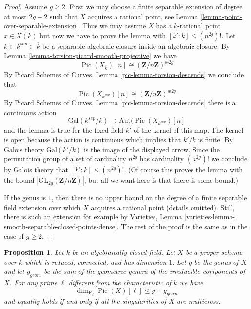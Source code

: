 \documentclass{stacks-project}
\theoremstyle{plain}
\newtheorem{proposition}[subsection]{Proposition}
\theoremstyle{definition}
\theoremstyle{remark}
\numberwithin{equation}{subsection}
\def\Pic{\mathop{\mathrm{Pic}}\nolimits}
\begin{document}
\begin{proof}
Assume $g \geq 2$. First we may choose a finite separable extension
of degree at most $2g - 2$ such that $X$ acquires a rational point, see
Lemma \ref{lemma-point-over-separable-extension}.
Thus we may assume $X$ has a $k$-rational point $x \in X(k)$
but now we have to prove the lemma with
$[k' : k] \leq (n^{2g})!$.
Let $k \subset k^{sep} \subset \overline{k}$ be a separable algebraic
closure inside an algebraic closure.
By Lemma \ref{lemma-torsion-picard-smooth-projective} we have
$$
\Pic(X_{\overline{k}})[n] \cong (\mathbf{Z}/n\mathbf{Z})^{\oplus 2g}
$$
By Picard Schemes of Curves, Lemma \ref{pic-lemma-torsion-descends}
we conclude that
$$
\Pic(X_{k^{sep}})[n] \cong (\mathbf{Z}/n\mathbf{Z})^{\oplus 2g}
$$
By Picard Schemes of Curves, Lemma \ref{pic-lemma-torsion-descends}
there is a continuous action
$$
\text{Gal}(k^{sep}/k)
\longrightarrow
\text{Aut}(\Pic(X_{k^{sep}})[n]
$$
and the lemma is true for the fixed field $k'$ of the kernel of this map.
The kernel is open because the action is continuous which implies
that $k'/k$ is finite. By Galois theory $\text{Gal}(k'/k)$
is the image of the displayed arrow. Since the permutation
group of a set of cardinality $n^{2g}$ has cardinality $(n^{2g})!$
we conclude by Galois theory that $[k' : k] \leq (n^{2g})!$.
(Of course this proves the lemma with the bound
$|\text{GL}_{2g}(\mathbf{Z}/n\mathbf{Z})|$, but all we want
here is that there is some bound.)

\medskip\noindent
If the genus is $1$, then there is no upper bound on the degree of a
finite separable field extension over which $X$ acquires a rational point
(details omitted). Still, there is such an extension for example by
Varieties, Lemma \ref{varieties-lemma-smooth-separable-closed-points-dense}.
The rest of the proof is the same as in the case of $g \geq 2$.
\end{proof}

\begin{proposition}
\label{proposition-torsion-picard-reduced-proper}
Let $k$ be an algebraically closed field. Let $X$ be a proper scheme over $k$
which is reduced, connected, and has dimension $1$. Let $g$ be the genus
of $X$ and let $g_{geom}$ be the sum of the geometric genera of the
irreducible components of $X$. For any prime $\ell$ different from
the characteristic of $k$ we have
$$
\dim_{\mathbf{F}_\ell} \Pic(X)[\ell]
\leq g + g_{geom}
$$
and equality holds if and only if all the singularities of $X$
are multicross.
\end{proposition}
\end{document}
